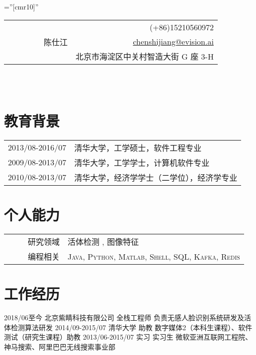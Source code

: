 \documentclass[a4paper,10pt]{professional-cv-cn}
\begin{document}
\pagestyle{empty}

\font\fb=''[cmr10]''

\begin{tabular}{lr}
\multirow{4}{24em}{\Huge ~~~~~~~~~陈仕江}

    & (+86)15210560972 \\

    & \href{mailto:chenshijiang@evision.ai}{chenshijiang@evision.ai} \\

    & 北京市海淀区中关村智造大街 G 座 3-H
\end{tabular}
\\
\\

\section{教育背景}
\begin{tabular}{rl}
 \textsc{2013/08-2016/07} & 清华大学，工学硕士，软件工程专业 \\
 \textsc{2009/08-2013/07} & 清华大学，工学学士，计算机软件专业 \\
 \textsc{2010/08-2013/07} & 清华大学，经济学学士（二学位），经济学专业
\end{tabular}

\section{个人能力}
\begin{tabular}{rl}
 \textsc{~~~~~研究领域}& \textsc{ 活体检测 }, \textsc{ 图像特征 }\\
 \textsc{~~~~~编程相关}& \textsc{Java}, \textsc{Python}, \textsc{Matlab}, \textsc{Shell}, \textsc{SQL}, \textsc{Kafka}, \textsc{Redis}\\
\end{tabular}

\section{工作经历}
\begin{entrylist}
  \internentry
    {2018/06至今}
    {北京紫睛科技有限公司}
    {全栈工程师}
    {负责无感人脸识别系统研发及活体检测算法研发}
  \internentry
    {2014/09-2015/07}
    {清华大学}
    {助教}
    {数字媒体2（本科生课程）、软件测试（研究生课程）助教}
  \internentry
    {2013/06-2015/07}
    {实习}
    {实习生}
    {微软亚洲互联网工程院、神马搜索、阿里巴巴无线搜索事业部}
\end{entrylist}
\end{document}
